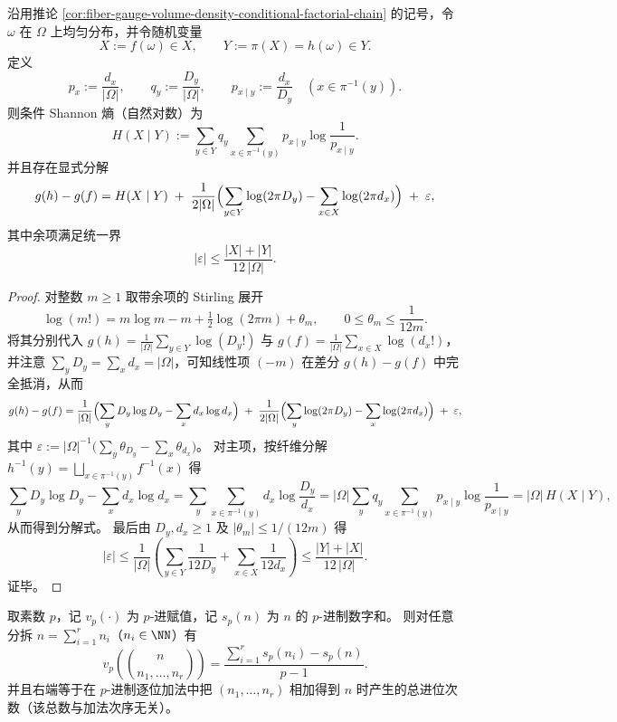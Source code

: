 \begin{proposition}\label{prop:fiber-gauge-volume-increment-conditional-shannon-stirling}
沿用推论 \ref{cor:fiber-gauge-volume-density-conditional-factorial-chain} 的记号，令 \(\omega\) 在 \(\Omega\) 上均匀分布，并令随机变量
\[
X:=f(\omega)\in X,\qquad Y:=\pi(X)=h(\omega)\in Y.
\]
定义
\[
p_x:=\frac{d_x}{|\Omega|},\qquad
q_y:=\frac{D_y}{|\Omega|},\qquad
p_{x\mid y}:=\frac{d_x}{D_y}\quad(x\in\pi^{-1}(y)).
\]
则条件 Shannon 熵（自然对数）为
\[
H(X\mid Y):=\sum_{y\in Y}q_y\sum_{x\in\pi^{-1}(y)}p_{x\mid y}\log\frac{1}{p_{x\mid y}}.
\]
并且存在显式分解
\[
g(h)-g(f)
=H(X\mid Y)
\;+\;\frac{1}{2|\Omega|}\Bigl(\sum_{y\in Y}\log(2\pi D_y)-\sum_{x\in X}\log(2\pi d_x)\Bigr)
\;+\;\varepsilon,
\]
其中余项满足统一界
\[
|\varepsilon|\le \frac{|X|+|Y|}{12\,|\Omega|}.
\]
\end{proposition}
\begin{proof}
对整数 \(m\ge 1\) 取带余项的 Stirling 展开
\[
\log(m!)=m\log m-m+\tfrac12\log(2\pi m)+\theta_m,
\qquad
0\le \theta_m\le \frac{1}{12m}.
\]
将其分别代入
\(
g(h)=\frac{1}{|\Omega|}\sum_{y\in Y}\log(D_y!)
\)
与
\(
g(f)=\frac{1}{|\Omega|}\sum_{x\in X}\log(d_x!)
\)，
并注意 \(\sum_{y}D_y=\sum_x d_x=|\Omega|\)，可知线性项 \((-m)\) 在差分 \(g(h)-g(f)\) 中完全抵消，从而
\[
g(h)-g(f)
=\frac{1}{|\Omega|}\Bigl(\sum_{y}D_y\log D_y-\sum_x d_x\log d_x\Bigr)
\;+\;\frac{1}{2|\Omega|}\Bigl(\sum_{y}\log(2\pi D_y)-\sum_x\log(2\pi d_x)\Bigr)
\;+\;\varepsilon,
\]
其中
\(
\varepsilon:=|\Omega|^{-1}\bigl(\sum_y\theta_{D_y}-\sum_x\theta_{d_x}\bigr)
\)。
对主项，按纤维分解 \(h^{-1}(y)=\bigsqcup_{x\in\pi^{-1}(y)}f^{-1}(x)\) 得
\[
\sum_{y}D_y\log D_y-\sum_x d_x\log d_x
=\sum_{y}\sum_{x\in\pi^{-1}(y)}d_x\log\frac{D_y}{d_x}
=|\Omega|\sum_{y}q_y\sum_{x\in\pi^{-1}(y)}p_{x\mid y}\log\frac{1}{p_{x\mid y}}
=|\Omega|\,H(X\mid Y),
\]
从而得到分解式。
最后由 \(D_y,d_x\ge 1\) 及 \(|\theta_m|\le 1/(12m)\) 得
\[
|\varepsilon|
\le
\frac{1}{|\Omega|}\left(\sum_{y\in Y}\frac{1}{12D_y}+\sum_{x\in X}\frac{1}{12d_x}\right)
\le
\frac{|Y|+|X|}{12\,|\Omega|}.
\]
证毕。
\end{proof}

\begin{theorem}\label{thm:multinomial-vp-carry-signature}
取素数 \(p\)，记 \(v_p(\cdot)\) 为 \(p\)-进赋值，记 \(s_p(n)\) 为 \(n\) 的 \(p\)-进制数字和。
则对任意分拆 \(n=\sum_{i=1}^{r}n_i\)（\(n_i\in\NN\)）有
\[
\boxed{\;
v_p\!\left(\binom{n}{n_1,\dots,n_r}\right)
=
\frac{\sum_{i=1}^{r}s_p(n_i)-s_p(n)}{p-1}.
\;}
\]
并且右端等于在 \(p\)-进制逐位加法中把 \((n_1,\dots,n_r)\) 相加得到 \(n\) 时产生的总进位次数（该总数与加法次序无关）。
\end{theorem}

